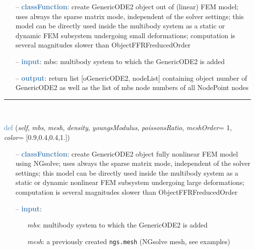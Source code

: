 \begin{itemize}[leftmargin=1.4cm]
\begin{itemize}[leftmargin=1.4cm]
\begin{itemize}[leftmargin=0.5cm]
\begin{itemize}[leftmargin=1.4cm]
\begin{itemize}[leftmargin=1.4cm]
\begin{itemize}[leftmargin=0.5cm]
\begin{itemize}[leftmargin=0.7cm]
\item[--]\textcolor{steelblue}{\bf classFunction}: create GenericODE2 object out of (linear) FEM model; uses always the sparse matrix mode, independent of the solver settings; this model can be directly used inside the multibody system as a static or dynamic FEM subsystem undergoing small deformations; computation is several magnitudes slower than ObjectFFRFreducedOrder
\item[--]\textcolor{steelblue}{\bf input}: mbs: multibody system to which the GenericODE2 is added
\item[--]\textcolor{steelblue}{\bf output}: return list [oGenericODE2, nodeList] containing object number of GenericODE2 as well as the list of mbs node numbers of all NodePoint nodes
\vspace{12pt}\end{itemize}
%
\noindent\rule{8cm}{0.75pt}\vspace{1pt} \\ 
\begin{flushleft}
\noindent \textcolor{steelblue}{def {\bf {}}}\label{sec:FEM:FEMinterface:CreateNonlinearFEMObjectGenericODE2NGsolve}
({\it self}, {\it mbs}, {\it mesh}, {\it density}, {\it youngsModulus}, {\it poissonsRatio}, {\it meshOrder}= 1, {\it color}= [0.9,0.4,0.4,1.])
\end{flushleft}
\setlength{\itemindent}{0.7cm}
\begin{itemize}[leftmargin=0.7cm]
\item[--]\textcolor{steelblue}{\bf classFunction}: create GenericODE2 object fully nonlinear FEM model using NGsolve; uses always the sparse matrix mode, independent of the solver settings; this model can be directly used inside the multibody system as a static or dynamic nonlinear FEM subsystem undergoing large deformations; computation is several magnitudes slower than ObjectFFRFreducedOrder
\item[--]\textcolor{steelblue}{\bf input}: \vspace{-6pt}
\begin{itemize}[leftmargin=1.2cm]
\setlength{\itemindent}{-0.7cm}
\item[]{\it mbs}: multibody system to which the GenericODE2 is added
\item[]{\it mesh}: a previously created \texttt{ngs.mesh} (NGsolve mesh, see examples)

\end{itemize}
\end{itemize}
\end{itemize}
\end{itemize}
\end{itemize}
\end{itemize}
\end{itemize}
\end{itemize}
